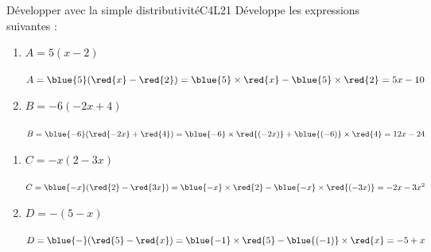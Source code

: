 \def\points{4}
\def\rdifficulty{1}
\begin{EXO}{Développer avec la simple distributivité}{C4L21}
    Développe les expressions suivantes :
    \vspace{-0.35cm}\begin{multicols}{2}
        \begin{enumerate}
            \item $A = 5(x-2)$\begin{crep}
            $A = \blue{5}(\red{x}-\red{2}) \\= \blue{5}\times\red{x}-\blue{5}\times\red{2}\\ = 5x - 10$
            \end{crep}
            \item $B = -6(-2x+4)$\begin{crep}
            $B = \blue{-6}(\red{-2x}+\red{4}) \\= \blue{-6}\times\red{(-2x)}+\blue{(-6)}\times\red{4} \\= 12x - 24$
            \end{crep}
        \end{enumerate}
    \end{multicols}
    \begin{multicols}{2}
        \begin{enumerate}[start=3]
            \item $C = -x(2-3x)$\begin{crep}
            $C = \blue{-x}(\red{2}-\red{3x}) \\= \blue{-x}\times\red{2}-\blue{-x}\times\red{(-3x)} \\= -2x - 3x^2$
            \end{crep}
            \item $D = -(5-x)$\begin{crep}
            $D = \blue{-}(\red{5}-\red{x}) \\= \blue{-1}\times\red{5}-\blue{(-1)}\times\red{x} \\= -5 + x$
            \end{crep}
        \end{enumerate}
    \end{multicols}
\end{EXO}

